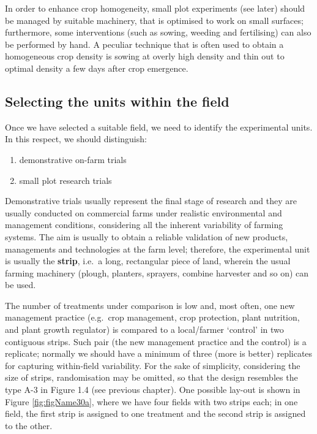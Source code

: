 \documentclass[a4paper,12pt,oneside]{book}
\providecommand{\tightlist}{%
  \setlength{\itemsep}{0pt}\setlength{\parskip}{0pt}}
\begin{document}
In order to enhance crop homogeneity, small plot experiments (see later) should be managed by suitable machinery, that is optimised to work on small surfaces; furthermore, some interventions (such as sowing, weeding and fertilising) can also be performed by hand. A peculiar technique that is often used to obtain a homogeneous crop density is sowing at overly high density and thin out to optimal density a few days after crop emergence.

\hypertarget{selecting-the-units-within-the-field}{%
\subsection{Selecting the units within the field}\label{selecting-the-units-within-the-field}}

Once we have selected a suitable field, we need to identify the experimental units. In this respect, we should distinguish:

\begin{enumerate}
\def\labelenumi{\arabic{enumi}.}
\tightlist
\item
  demonstrative on-farm trials
\item
  small plot research trials
\end{enumerate}

Demonstrative trials usually represent the final stage of research and they are usually conducted on commercial farms under realistic environmental and management conditions, considering all the inherent variability of farming systems. The aim is usually to obtain a reliable validation of new products, managements and technologies at the farm level; therefore, the experimental unit is usually the \textbf{strip}, i.e.~a long, rectangular piece of land, wherein the usual farming machinery (plough, planters, sprayers, combine harvester and so on) can be used.

The number of treatments under comparison is low and, most often, one new management practice (e.g.~crop management, crop protection, plant nutrition, and plant growth regulator) is compared to a local/farmer `control' in two contiguous strips. Such pair (the new management practice and the control) is a replicate; normally we should have a minimum of three (more is better) replicates for capturing within-field variability. For the sake of simplicity, considering the size of strips, randomisation may be omitted, so that the design resembles the type A-3 in Figure 1.4 (see previous chapter). One possible lay-out is shown in Figure \ref{fig:figName30a}, where we have four fields with two strips each; in one field, the first strip is assigned to one treatment and the second strip is assigned to the other.
\end{document}
